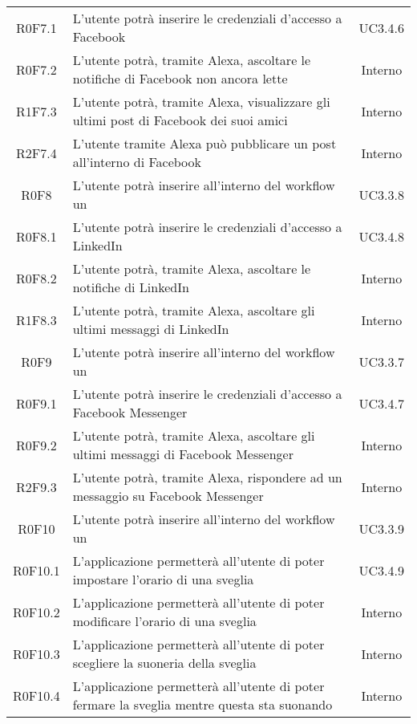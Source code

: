 \begin{center}
\begin{longtable}{cm{8cm}c }
	R0F7.1 & L'utente potrà inserire le credenziali d'accesso a Facebook & UC3.4.6 \\
	R0F7.2 & L'utente potrà, tramite Alexa, ascoltare le notifiche di Facebook non ancora lette & Interno \\
	R1F7.3 & L'utente potrà, tramite Alexa, visualizzare gli ultimi post di Facebook dei suoi amici & Interno \\
	R2F7.4 & L'utente tramite Alexa può pubblicare un post all'interno di Facebook & Interno \\ 
	R0F8 & L'utente potrà inserire all'interno del workflow un \BLinkedIn{} & UC3.3.8 \\
	R0F8.1 & L'utente potrà inserire le credenziali d'accesso a LinkedIn & UC3.4.8 \\
	R0F8.2 & L'utente potrà, tramite Alexa, ascoltare le notifiche di LinkedIn  & Interno \\
	R1F8.3 & L'utente potrà, tramite Alexa, ascoltare gli ultimi messaggi di LinkedIn & Interno \\
	R0F9 & L'utente potrà inserire all'interno del workflow un \BMessenger{} & UC3.3.7 \\
	R0F9.1 & L'utente potrà inserire le credenziali d'accesso a Facebook Messenger & UC3.4.7 \\
	R0F9.2 & L'utente potrà, tramite Alexa, ascoltare gli ultimi messaggi di Facebook Messenger & Interno \\
	R2F9.3 & L'utente potrà, tramite Alexa, rispondere ad un messaggio su Facebook Messenger & Interno \\
	R0F10 & L'utente potrà inserire all'interno del workflow un \BSveglia{} & UC3.3.9 \\
	R0F10.1 & L'applicazione permetterà all'utente di poter impostare l'orario di una sveglia & UC3.4.9 \\
	R0F10.2 & L'applicazione permetterà all'utente di poter modificare l'orario di una sveglia & Interno \\
	R0F10.3 & L'applicazione permetterà all'utente di poter scegliere la suoneria della sveglia & Interno \\
	R0F10.4 & L'applicazione permetterà all'utente di poter fermare la sveglia mentre questa sta suonando & Interno \\

\end{longtable}
\end{center}
